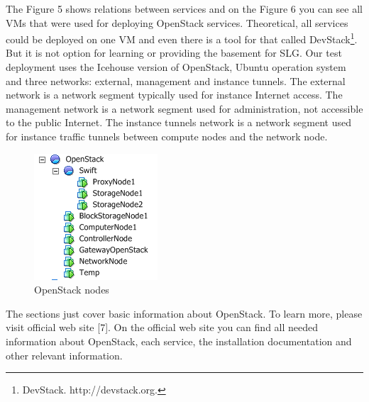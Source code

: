 The Figure 5 shows relations between services and on the Figure 6 you can see all VMs that were used for deploying OpenStack services. Theoretical, all services could be deployed on one VM and even there is a tool for that called DevStack\footnote{DevStack. http://devstack.org.}. But it is not option for learning or providing the basement for SLG. Our test deployment uses the Icehouse version of OpenStack, Ubuntu operation system and three networks: external, management and instance tunnels. The external network is a network segment typically used for instance Internet access. The management network is a network segment used for administration, not accessible to the public Internet. The instance tunnels network is a network segment used for instance traffic tunnels between compute nodes and the network node.  

\begin{figure}[ht!]
\centering
\includegraphics{openstack_tree.png}
\caption{OpenStack nodes}
\label{overflow}
\end{figure}



The sections just cover basic information about OpenStack. To learn more, please visit official web site [7]. On the official web site you can find all needed information about OpenStack, each service, the installation documentation and other relevant information. 


